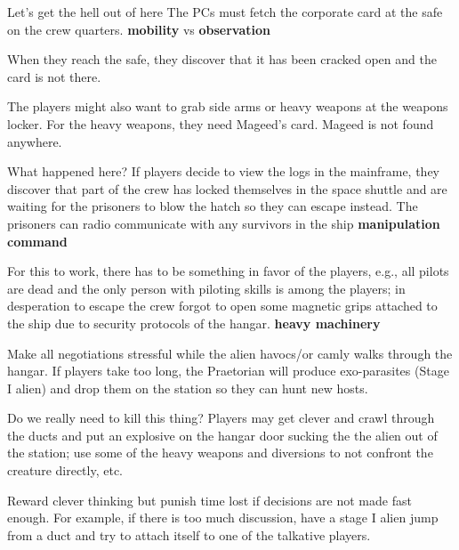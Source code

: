 \begin{rpg-commentbox}{Let's get the hell out of here}
   The PCs must fetch the corporate card at the safe on the crew quarters. \textbf{mobility} vs \textbf{observation}

   When they reach the safe, they discover that it has been cracked open and the card is not there.

   \medskip

    The players might also want to grab side arms or heavy weapons at the weapons locker. For the heavy weapons, they need Mageed's card.
    Mageed is not found anywhere.
\end{rpg-commentbox}



\begin{rpg-commentbox}{What happened here?}
    If players decide to view the logs in the mainframe, they discover that part of the crew has locked themselves in the space shuttle and are waiting 
    for the prisoners to blow the hatch so they can escape instead. The prisoners can radio communicate with any survivors in the ship \textbf{manipulation} \textbf{command}

    For this to work, there has to be something in favor of the players, e.g., all pilots are dead and the only person with piloting skills is among the players; in desperation to escape the crew forgot to open some magnetic grips attached to the ship due to security protocols of the hangar. \textbf{heavy machinery}

    Make all negotiations stressful while the alien havocs/or camly walks through the hangar. If players take too long, the Praetorian will produce exo-parasites (Stage I alien) and drop them on the station so they can hunt new hosts.
 \end{rpg-commentbox}

 
\begin{rpg-commentbox}{Do we really need to kill this thing?}
    Players may get clever and crawl through the ducts and put an explosive on the hangar door sucking the the alien out of the station; use some of the heavy weapons and diversions to not confront the creature directly, etc.

    Reward clever thinking but punish time lost if decisions are not made fast enough. For example, if there is too much discussion, have a stage I alien jump from a duct and try to attach itself to one of the talkative players. 
 \end{rpg-commentbox}

